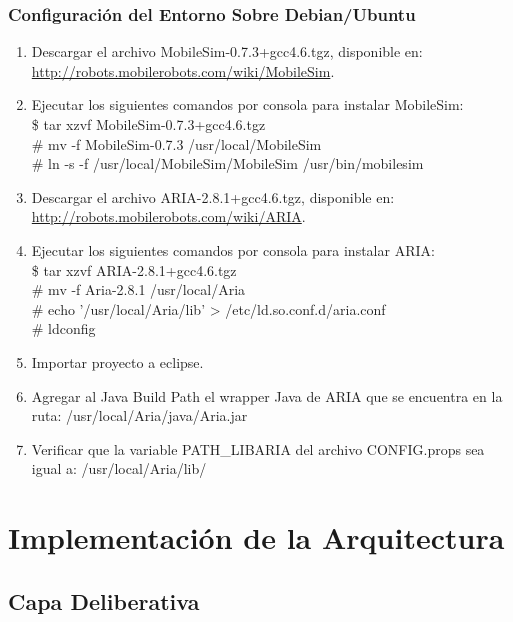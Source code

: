 \documentclass[11pt,twoside,A5]{article}
\newcommand{\sourcecode}[2][\footnotesize]{{\ttfamily#1#2}}
\newcommand{\link}[1]{{\footnotesize\url{#1}}}
\begin{document}
\subsubsection*{Configuración del Entorno Sobre Debian/Ubuntu}

\begin{enumerate}
\item Descargar el archivo \sourcecode{MobileSim-0.7.3+gcc4.6.tgz}, disponible en: \\ \link{http://robots.mobilerobots.com/wiki/MobileSim}.
\item Ejecutar los siguientes comandos por consola para instalar MobileSim:
\sourcecode{ 
\\ \$ tar xzvf MobileSim-0.7.3+gcc4.6.tgz
\\ \# mv -f MobileSim-0.7.3 /usr/local/MobileSim
\\ \# ln -s -f /usr/local/MobileSim/MobileSim /usr/bin/mobilesim}
\item Descargar el archivo \sourcecode{ARIA-2.8.1+gcc4.6.tgz}, disponible en: \\ \link{http://robots.mobilerobots.com/wiki/ARIA}.
\item Ejecutar los siguientes comandos por consola para instalar ARIA:
\sourcecode{
\\ \$ tar xzvf ARIA-2.8.1+gcc4.6.tgz
\\ \# mv -f Aria-2.8.1 /usr/local/Aria
\\ \# echo '/usr/local/Aria/lib' > /etc/ld.so.conf.d/aria.conf
\\ \# ldconfig}
\item Importar proyecto a eclipse.
\item Agregar al \sourcecode{Java Build Path} el wrapper Java de ARIA que se encuentra en la ruta: \sourcecode{/usr/local/Aria/java/Aria.jar}
\item Verificar que la variable \sourcecode{PATH\_LIBARIA} del archivo \sourcecode{CONFIG.props} 
	  sea igual a: \sourcecode{/usr/local/Aria/lib/}
\end{enumerate}

\section*{Implementación de la Arquitectura}

\subsection*{Capa Deliberativa}
\end{document}

